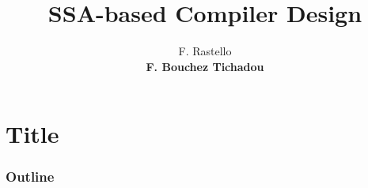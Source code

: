 \documentclass{beamer}
\begin{document}
\newcommand{\before}{\prec_{\mbox{\scriptsize seq}}}
\newcommand{\violet}[1]{{\color{violet}{#1}}}
\newcommand{\red}[1]{{\color{red}{#1}}}
\newcommand{\blue}[1]{{\color{blue}{#1}}}
\newcommand{\green}[1]{{\color{green2}{#1}}}
\newcommand{\gray}[1]{{\color{gray}{#1}}}
\newcommand{\mysmiley}{\Large \color{red}{\smiley}}
\newcommand{\sad}{\texttt{[image: fig/flag-smiley-sad.png]}}
\def\Va{\only<0>{a}\only<1>{\red{a}}\only<2->{\red{\ad}}}
\def\Vd{\only<0>{d}\only<1>{\red{d}}\only<2->{\red{\ad}}}
\def\move{\texttt{MOVE}}
\def\ad{a\hspace{-0.2em}d}
\newcommand{\gr}[1]{{greedy-$#1$-colorable}}
\newcommand{\Gr}[1]{{Greedy-$#1$-colorable}}
\renewcommand{\emph}[1]{{\usebeamercolor[fg]{titlelike}#1}}



\title[SSA-based Compiler Design]{SSA-based Compiler Design}
\author[F. Bouchez Tichadou]%
{F. Rastello\inst{*}\\
\textbf{F. Bouchez Tichadou\inst{\dagger}}
}

\date[CRI'13]{}



\section*{Title}
\mymaketitle

\begin{frame}
  \frametitle{Outline}
  \tableofcontents%
\end{frame}
\end{document}
